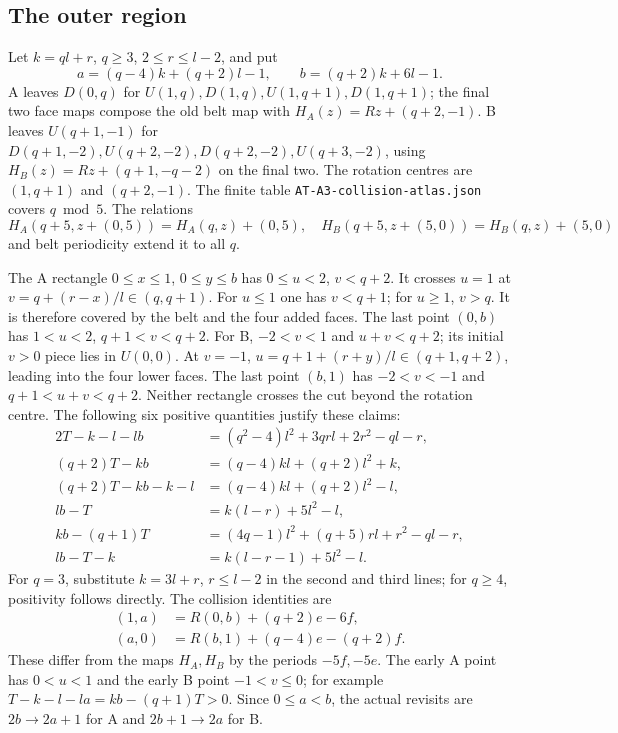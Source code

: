 \documentclass[11pt]{amsart}
\newcommand{\record}[1]{\nolinkurl{#1}}
\begin{document}
\subsection{The outer region}
Let $k=ql+r$, $q\ge3$, $2\le r\le l-2$, and put
\[
 a=(q-4)k+(q+2)l-1,\qquad b=(q+2)k+6l-1.
\]
A leaves $D(0,q)$ for $U(1,q),D(1,q),U(1,q+1),D(1,q+1)$;
the final two face maps compose the old belt map with
$H_A(z)=Rz+(q+2,-1)$. B leaves $U(q+1,-1)$ for
$D(q+1,-2),U(q+2,-2),D(q+2,-2),U(q+3,-2)$, using
$H_B(z)=Rz+(q+1,-q-2)$ on the final two. The rotation centres are
$(1,q+1)$ and $(q+2,-1)$. The finite table
\record{AT-A3-collision-atlas.json} covers $q\bmod5$.
The relations
\[
 H_A(q+5,z+(0,5))=H_A(q,z)+(0,5),\quad
 H_B(q+5,z+(5,0))=H_B(q,z)+(5,0)
\]
and belt periodicity extend it to all $q$.

The A rectangle $0\le x\le1$, $0\le y\le b$ has $0\le u<2$,
$v<q+2$. It crosses $u=1$ at $v=q+(r-x)/l\in(q,q+1)$.
For $u\le1$ one has $v<q+1$; for $u\ge1$, $v>q$. It is therefore
covered by the belt and the four added faces. The last point $(0,b)$
has $1<u<2$, $q+1<v<q+2$.
For B, $-2<v<1$ and $u+v<q+2$; its initial $v>0$ piece lies in
$U(0,0)$. At $v=-1$, $u=q+1+(r+y)/l\in(q+1,q+2)$, leading into
the four lower faces. The last point $(b,1)$ has $-2<v<-1$ and
$q+1<u+v<q+2$. Neither rectangle crosses the cut beyond the rotation
centre. The following six positive quantities justify these claims:
\begin{align*}
2T-k-l-lb&=(q^2-4)l^2+3qrl+2r^2-ql-r,\\
(q+2)T-kb&=(q-4)kl+(q+2)l^2+k,\\
(q+2)T-kb-k-l&=(q-4)kl+(q+2)l^2-l,\\
lb-T&=k(l-r)+5l^2-l,\\
kb-(q+1)T&=(4q-1)l^2+(q+5)rl+r^2-ql-r,\\
lb-T-k&=k(l-r-1)+5l^2-l.
\end{align*}
For $q=3$, substitute $k=3l+r$, $r\le l-2$ in the second and third
lines; for $q\ge4$, positivity follows directly. The collision identities are
\begin{equation}\label{eq:7}
\begin{aligned}
(1,a)&=R(0,b)+(q+2)e-6f,\\
(a,0)&=R(b,1)+(q-4)e-(q+2)f.
\end{aligned}\tag{7}
\end{equation}
These differ from the maps $H_A,H_B$ by the periods $-5f,-5e$.
The early A point has $0<u<1$ and the early B point $-1<v\le0$;
for example $T-k-l-la=kb-(q+1)T>0$. Since $0\le a<b$, the actual
revisits are $2b\to2a+1$ for A and $2b+1\to2a$ for B.
\end{document}
